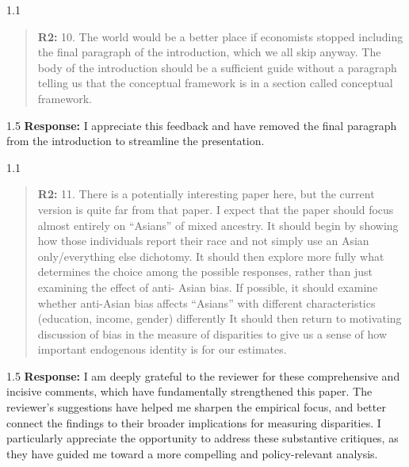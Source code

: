 \documentclass[12pt,english]{article}
\newcommand{\rrquote}{1.1}
\newcommand{\rrxspc}{1.5}
\begin{document}
\begin{refsection}
    \begin{spacing}{\rrquote}
        \begin{quotation}
        \textbf{R2: } 10. The world would be a better place if economists stopped including the final paragraph of the introduction, which we all skip anyway. The body of the introduction should be a sufficient guide without a paragraph telling us that the conceptual framework is in a section called conceptual framework.
        \end{quotation}
        \end{spacing}
        
        \begin{spacing}{\rrxspc}
           \textbf{Response:} I appreciate this feedback and have removed the final paragraph from the introduction to streamline the presentation.
    \end{spacing}

    \begin{spacing}{\rrquote}
        \begin{quotation}
        \textbf{R2: } 11. There is a potentially interesting paper here, but the current version is quite far from that paper. I expect that the paper should focus almost entirely on “Asians” of mixed ancestry. It should begin by showing how those individuals report their race and not simply use an Asian only/everything else dichotomy. It should then explore more fully what determines the choice among the possible responses, rather than just examining the effect of anti- Asian bias. If possible, it should examine whether anti-Asian bias affects “Asians” with different characteristics (education, income, gender) differently It should then return to motivating discussion of bias in the measure of disparities to give us a sense of how important endogenous identity is for our estimates.
        \end{quotation}
        \end{spacing}
        
        \begin{spacing}{\rrxspc}
        \textbf{Response:} I am deeply grateful to the reviewer for these comprehensive and incisive comments, which have fundamentally strengthened this paper. The reviewer's suggestions have helped me sharpen the empirical focus, and better connect the findings to their broader implications for measuring disparities. I particularly appreciate the opportunity to address these substantive critiques, as they have guided me toward a more compelling and policy-relevant analysis.
        

\end{spacing}
\end{refsection}
\end{document}
